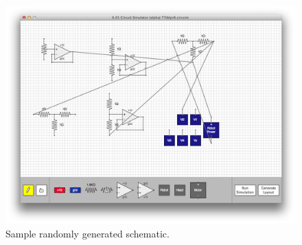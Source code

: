\begin{figure}
\begin{center}
\includegraphics[width=\textwidth]{Images/auto_generation_example.png}
\caption{Sample randomly generated schematic.}
\label{fig:example_random_schematic}
\end{center}
\end{figure}
